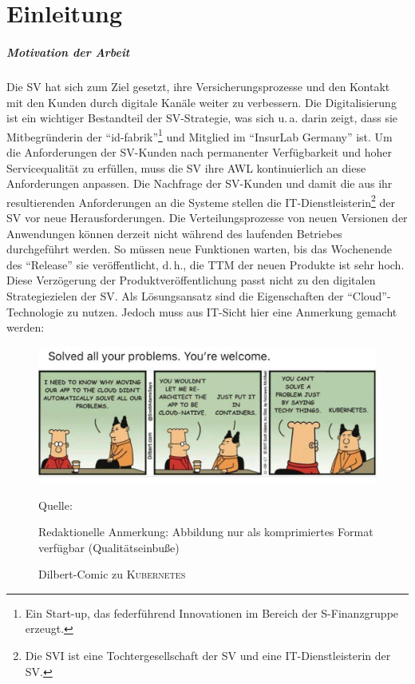 \acresetall 

\chapter{Einleitung}\label{kap:einleitung}
\paragraph{Motivation der Arbeit}
Die \ac{SV} hat sich zum Ziel gesetzt, ihre Versicherungsprozesse und den Kontakt mit den Kunden durch digitale Kanäle weiter zu verbessern. Die Digitalisierung ist ein wichtiger Bestandteil der \ac{SV}-Strategie, was sich u.\,a. darin zeigt, dass sie Mitbegründerin der \enquote{id-fabrik}\footnote{Ein Start-up, das federführend Innovationen im Bereich der S-Finanzgruppe erzeugt.} und Mitglied im \enquote{InsurLab Germany}\autocite[vgl.][S.\,30]{sv_sparkassenversicherung_sv_2019} ist. Um die Anforderungen der \ac{SV}-Kunden nach permanenter Verfügbarkeit und hoher Servicequalität zu erfüllen, muss die \ac{SV} ihre \ac{AWL} kontinuierlich an diese Anforderungen anpassen. Die Nachfrage der \ac{SV}-Kunden und damit die aus ihr resultierenden Anforderungen an die Systeme stellen die IT-Dienstleisterin\footnote{Die \ac{SVI} ist eine Tochtergesellschaft der \ac{SV} und eine IT-Dienstleisterin der \ac{SV}.} der \ac{SV} vor neue Herausforderungen. Die Verteilungsprozesse von neuen Versionen der Anwendungen können derzeit nicht während des laufenden Betriebes durchgeführt werden. So müssen neue Funktionen warten, bis das Wochenende des \enquote{Release} sie veröffentlicht, d.\,h., die \ac{TTM} der neuen Produkte ist sehr hoch. Diese Verzögerung der Produktveröffentlichung passt nicht zu den digitalen Strategiezielen der \ac{SV}. Als Lösungsansatz sind die Eigenschaften der \enquote{Cloud}-Technologie zu nutzen. Jedoch muss aus IT-Sicht hier eine Anmerkung gemacht werden:

\begin{figure}[h!]
	\centering
	\includegraphics[scale=0.33]{img/dilbertCloud.jpeg}
	\caption{Dilbert-Comic zu \textsc{Kubernetes}}
	\label{abb:dilbertK8s}
	{\footnotesize Quelle: \cite{DilbertKubernetes}\par}
	{\footnotesize Redaktionelle Anmerkung: Abbildung nur als komprimiertes Format verfügbar (Qualitätseinbuße)}
\end{figure}

